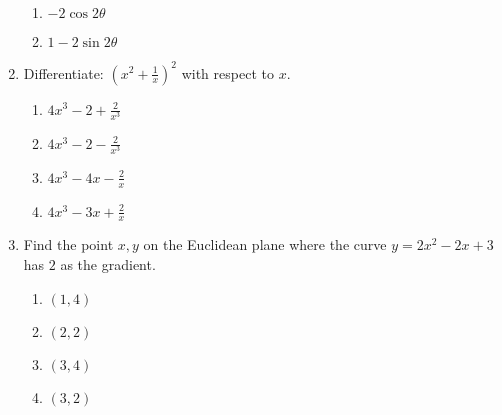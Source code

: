 \begin{enumerate}[label={\arabic*.}]
\begin{enumerate}[label={\Alph*.}]
            \item  \(-2\cos 2\theta\)
            \item  \(1-2\sin 2\theta\)
        \end{enumerate}
  \item Differentiate: \(\left(x^2 + \frac{1}{x}\right)^2\) with respect to \(x\).
       \begin{enumerate}[label={\Alph*.}]
            \item \(4x^3 - 2 + \frac{2}{x^3}\)
            \item  \(4x^3 - 2 - \frac{2}{x^3}\)
            \item   \(4x^3 - 4x - \frac{2}{x}\)
            \item    \(4x^3 - 3x + \frac{2}{x}\)
        \end{enumerate}
\item Find the point \(x,y\) on the Euclidean plane where the curve \(y = 2x^{2} - 2x +3\) has \(2\) as the gradient.
    \begin{enumerate}[label={\Alph*.}]
        \item \((1, 4)\)
        \item \((2, 2)\)
        \item \((3, 4)\)
        \item \((3, 2)\)
    \end{enumerate}
    

\end{enumerate}
